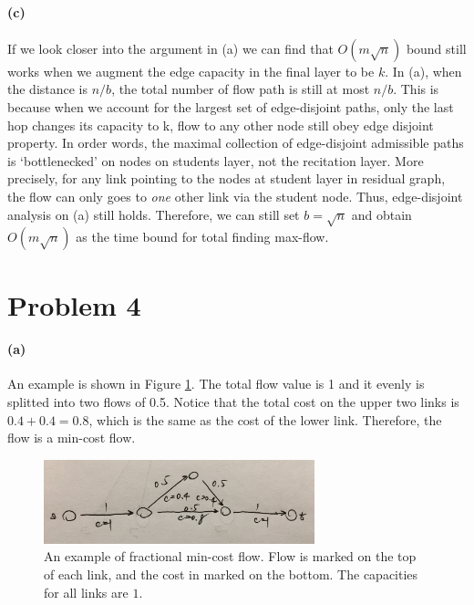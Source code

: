 \documentclass[12pt]{article}
\begin{document}
\paragraph{(c)} If we look closer into the argument in (a) we can find that $O(m\sqrt{n})$ bound still works when we augment the edge capacity in the final layer to be $k$. In (a), when the distance is $n/b$, the total number of flow path is still at most $n/b$. This is because when we account for the largest set of edge-disjoint paths, only the last hop changes its capacity to k, flow to any other node still obey edge disjoint property. In order words, the maximal collection of edge-disjoint admissible paths is `bottlenecked' on nodes on students layer, not the recitation layer. More precisely, for any link pointing to the nodes at student layer in residual graph, the flow can only goes to \emph{one} other link via the student node. Thus, edge-disjoint analysis on (a) still holds. Therefore, we can still set $b=\sqrt{n}$ and obtain $O(m\sqrt{n})$ as the time bound for total finding max-flow.

\pagebreak

\section*{Problem 4}
\paragraph{(a)} An example is shown in Figure \ref{fig:4-a}. The total flow value is 1 and it evenly is splitted into two flows of 0.5. Notice that the total cost on the upper two links is $0.4 + 0.4 = 0.8$, which is the same as the cost of the lower link. Therefore, the flow is a min-cost flow.
\begin{figure}[h!]
	\centering
	\includegraphics[width=0.7\textwidth]{4-a.jpg}
	\caption{An example of fractional min-cost flow. Flow is marked on the top of each link, and the cost in marked on the bottom. The capacities for all links are $1$.}
	\label{fig:4-a}
\end{figure}
\end{document}

